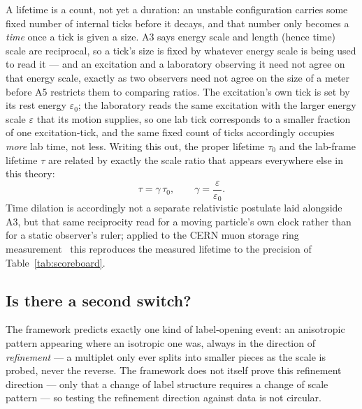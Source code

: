 \documentclass[pdflatex,sn-mathphys-num]{sn-jnl}
\theoremstyle{thmstyleone}
\theoremstyle{thmstylethree}
\theoremstyle{thmstyletwo}
\begin{document}
A lifetime is a count, not yet a duration: an unstable configuration
carries some fixed number of internal ticks before it decays, and that
number only becomes a \emph{time} once a tick is given a size. A3 says
energy scale and length (hence time) scale are reciprocal, so a tick's
size is fixed by whatever energy scale is being used to read it — and an
excitation and a laboratory observing it need not agree on that energy
scale, exactly as two observers need not agree on the size of a meter
before A5 restricts them to comparing ratios. The excitation's own tick
is set by its rest energy $\varepsilon_0$; the laboratory reads the same
excitation with the larger energy scale $\varepsilon$ that its motion
supplies, so one lab tick corresponds to a smaller fraction of one
excitation-tick, and the same fixed count of ticks accordingly occupies
\emph{more} lab time, not less. Writing this out, the proper lifetime
$\tau_0$ and the lab-frame lifetime $\tau$ are related by exactly the
scale ratio that appears everywhere else in this theory:
\begin{equation}
\tau = \gamma\,\tau_0, \qquad \gamma = \frac{\varepsilon}{\varepsilon_0}.
\end{equation}
Time dilation is accordingly not a separate relativistic postulate laid
alongside A3, but that same reciprocity read for a moving particle's own
clock rather than for a static observer's ruler; applied to the CERN
muon storage ring measurement~\cite{Bailey1977} this reproduces the
measured lifetime to the precision of Table~\ref{tab:scoreboard}.

\subsection{Is there a second switch?}\label{ss:secondswitch}

The framework predicts exactly one kind of label-opening event: an
anisotropic pattern appearing where an isotropic one was, always in the
direction of \emph{refinement} — a multiplet only ever splits into
smaller pieces as the scale is probed, never the reverse. The framework
does not itself prove this refinement direction — only that a change of
label structure requires a change of scale pattern — so testing the
refinement direction against data is not circular.
\end{document}
